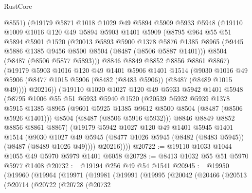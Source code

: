 \begin{lexlean}{RustCore}
\begin{coremodule}
        @8551)
      (@19179
        @5871
        @1018
        @1029
        @49
        @5894
        @5909
        @5933
        @5948
        (@19110
          @1009
          @1016
          @120
          @49
          @5894
          @5903
          @1401
          @5909
          (@8795
            @964
            @55
            @51
            @5894
            @5901
            @1520
            (@20013
              @5893
              @5900
              @1378
              @5876
              @1385
              @8965
              (@9445 @5886 @1385 @9456 @8500 @8504 (@8487 (@8506 @5887 @1401)))
              @8504
              (@8487 (@8506 @5877 @5893)))
            @8846
            @8849
            @8852
            @8856
            @8861
            @8867)
          (@19179
            @5903
            @1016
            @120
            @49
            @1401
            @5906
            @1401
            @1514
            (@9030
              @1016
              @49
              @5906
              (@8477 @1015 @5906 (@8482 (@8483 @5906)) (@8487 (@8489 @1015 @49))))
            @20216))
        (@19110
          @1020
          @1027
          @120
          @49
          @5933
          @5942
          @1401
          @5948
          (@8795
            @1006
            @55
            @51
            @5933
            @5940
            @1520
            (@20539
              @5932
              @5939
              @1378
              @5915
              @1385
              @8965
              (@9601 @5925 @1385 @9612 @8500 @8504 (@8487 (@8506 @5926 @1401)))
              @8504
              (@8487 (@8506 @5916 @5932)))
            @8846
            @8849
            @8852
            @8856
            @8861
            @8867)
          (@19179
            @5942
            @1027
            @120
            @49
            @1401
            @5945
            @1401
            @1514
            (@9030
              @1027
              @49
              @5945
              (@8477 @1026 @5945 (@8482 (@8483 @5945)) (@8487 (@8489 @1026 @49))))
            @20216))))
@20722 := @19110 @1033 @1044 @1055 @49 @5970 @5979 @1401 @6058
@20728 := @8413 @1032 @55 @51 @5970 @5977 @1408
@20732 := @19194 @256 @49 @54 @1541
@20945 := @19950
    (@19960
      (@19964
        (@19971
          (@19981
            (@19991
              (@19995
                (@20042
                  (@20466
                    (@20513
                      (@20714
                        (@20722
                          (@20728
                            (@20732

\end{coremodule}
\end{lexlean}
